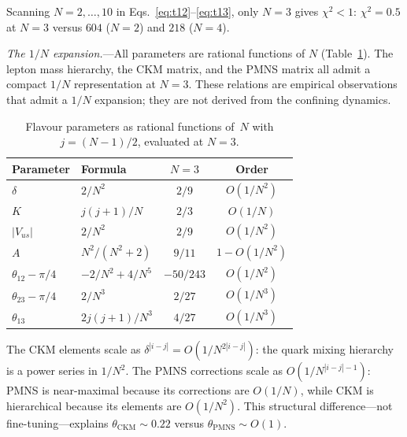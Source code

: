 \documentclass[aps,prl,twocolumn,showpacs,preprintnumbers,superscriptaddress]{revtex4-2}
\begin{document}
Scanning $N = 2,\ldots,10$ in
Eqs.~\eqref{eq:t12}--\eqref{eq:t13},
only $N = 3$ gives $\chi^2 < 1$:
$\chi^2 = 0.5$ at $N = 3$ versus $604$ ($N = 2$)
and $218$ ($N = 4$).


\textit{The $1/N$ expansion.}---All parameters are rational
functions of $N$ (Table~\ref{tab:1overN}).
The lepton mass hierarchy, the CKM matrix, and the PMNS
matrix all admit a compact $1/N$ representation at $N = 3$.
These relations are empirical observations that admit a
$1/N$ expansion; they are not derived from the confining
dynamics.

\begin{table}[t]
\caption{Flavour parameters as rational functions of~$N$
with $j = (N{-}1)/2$, evaluated at $N = 3$.}
\label{tab:1overN}
\begin{ruledtabular}
\begin{tabular}{llcc}
Parameter & Formula & $N{=}3$ & Order \\
\hline
$\delta$ & $2/N^2$ & $2/9$ & $O(1/N^2)$ \\
$K$ & $j(j{+}1)/N$ & $2/3$ & $O(1/N)$ \\
$|V_{us}|$ & $2/N^2$ & $2/9$ & $O(1/N^2)$ \\
$A$ & $N^2/(N^2{+}2)$ & $9/11$ & $1{-}O(1/N^2)$ \\
$\theta_{12}{-}\pi/4$ & $-2/N^2 + 4/N^5$ & $-50/243$ & $O(1/N^2)$ \\
$\theta_{23}{-}\pi/4$ & $2/N^3$ & $2/27$ & $O(1/N^3)$ \\
$\theta_{13}$ & $2j(j{+}1)/N^3$ & $4/27$ & $O(1/N^3)$ \\
\end{tabular}
\end{ruledtabular}
\end{table}

The CKM elements scale as $\delta^{|i-j|} = O(1/N^{2|i-j|})$:
the quark mixing hierarchy is a power series in $1/N^2$.
The PMNS corrections scale as $O(1/N^{|i-j|-1})$:
PMNS is near-maximal because its corrections are $O(1/N)$,
while CKM is hierarchical because its elements are $O(1/N^2)$.
This structural difference---not fine-tuning---explains
$\theta_{\text{CKM}} \sim 0.22$ versus
$\theta_{\text{PMNS}} \sim O(1)$.

\end{document}
